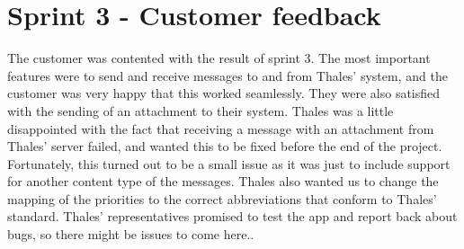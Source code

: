 \section{Sprint 3 - Customer feedback}

The customer was contented with the result of sprint 3. The most important features were to send and receive messages to and from Thales' system, and the customer was very happy that this worked seamlessly. They were also satisfied with the sending of an attachment to their system.
\newline
\newline
Thales was a little disappointed with the fact that receiving a message with an attachment from Thales' server failed, and wanted this to be fixed before the end of the project. Fortunately, this turned out to be a small issue as it was just to include support for another content type of the messages. Thales also wanted us to change the mapping of the priorities to the correct abbreviations that conform to Thales' standard. 
\newline
\newline
Thales' representatives promised to test the app and report back about bugs, so there might be issues to come here..